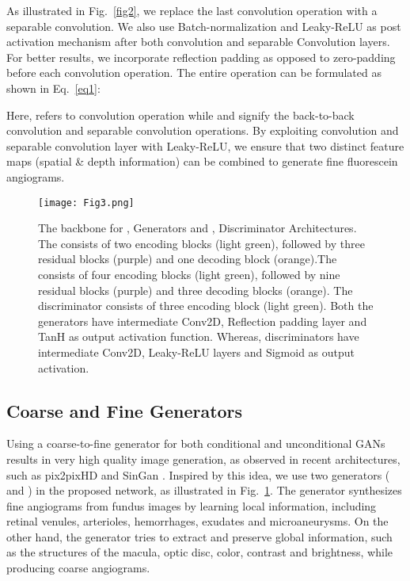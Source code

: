 \documentclass[runningheads]{llncs}
\begin{document}
As illustrated in Fig.~\ref{fig2}, we replace the last convolution operation with a separable convolution. We also use Batch-normalization and Leaky-ReLU as post activation mechanism after both convolution and separable Convolution layers. For better results, we incorporate reflection padding as opposed to zero-padding before each convolution operation. The entire operation can be formulated as shown in Eq.~\ref{eq1}:




Here,  refers to convolution operation while  and  signify the back-to-back convolution and separable convolution operations. By exploiting convolution and separable convolution layer with Leaky-ReLU, we ensure that two distinct feature maps (spatial \& depth information) can be combined to generate fine fluorescein angiograms. 

\begin{figure}[htb]
    \centering
    \texttt{[image: Fig3.png]}
    \caption{The backbone for ,  Generators and ,   Discriminator Architectures. The  consists of two encoding blocks (light green), followed by three residual blocks (purple) and one decoding block (orange).The  consists of four encoding blocks (light green), followed by nine residual blocks (purple) and three decoding blocks (orange). The discriminator consists of three encoding block (light green). Both the generators have intermediate Conv2D, Reflection padding layer and TanH as output activation function. Whereas, discriminators have intermediate Conv2D, Leaky-ReLU layers and Sigmoid as output activation.}
    \label{fig3}
\end{figure}


\subsection{Coarse and Fine Generators}\label{subsec:generators}

Using a coarse-to-fine generator for both conditional and unconditional GANs results in very high quality image generation, as observed in recent architectures, such as pix2pixHD \cite{wang2018high} and SinGan \cite{shaham2019singan}. Inspired by this idea, we use two generators ( and ) in the proposed network, as illustrated in Fig.~\ref{fig3}. The generator  synthesizes fine angiograms from fundus images by learning local information, including retinal venules, arterioles, hemorrhages, exudates and microaneurysms. On the other hand, the generator  tries to extract and preserve global information, such as the structures of the macula, optic disc, color, contrast and brightness, while producing coarse angiograms. 
\end{document}
